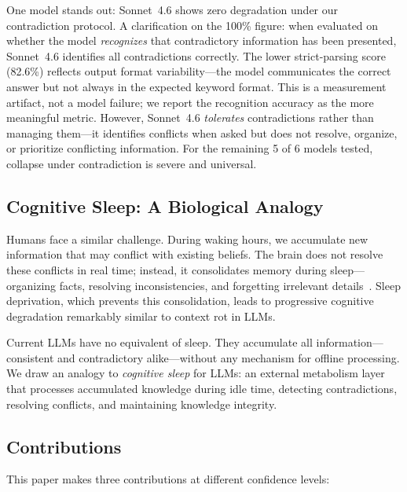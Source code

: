 \documentclass[11pt,a4paper]{article}
\begin{document}
One model stands out: Sonnet~4.6 shows zero degradation under our contradiction protocol.
A clarification on the 100\% figure: when evaluated on whether the model \emph{recognizes} that contradictory information has been presented, Sonnet~4.6 identifies all contradictions correctly.
The lower strict-parsing score (82.6\%) reflects output format variability---the model communicates the correct answer but not always in the expected keyword format.
This is a measurement artifact, not a model failure; we report the recognition accuracy as the more meaningful metric.
However, Sonnet~4.6 \emph{tolerates} contradictions rather than managing them---it identifies conflicts when asked but does not resolve, organize, or prioritize conflicting information.
For the remaining 5 of 6 models tested, collapse under contradiction is severe and universal.

\subsection{Cognitive Sleep: A Biological Analogy}

Humans face a similar challenge.
During waking hours, we accumulate new information that may conflict with existing beliefs.
The brain does not resolve these conflicts in real time; instead, it consolidates memory during sleep---organizing facts, resolving inconsistencies, and forgetting irrelevant details~\citep{walker2017sleep,stickgold2005sleep}.
Sleep deprivation, which prevents this consolidation, leads to progressive cognitive degradation remarkably similar to context rot in LLMs.

Current LLMs have no equivalent of sleep.
They accumulate all information---consistent and contradictory alike---without any mechanism for offline processing.
We draw an analogy to \emph{cognitive sleep} for LLMs: an external metabolism layer that processes accumulated knowledge during idle time, detecting contradictions, resolving conflicts, and maintaining knowledge integrity.

\subsection{Contributions}

This paper makes three contributions at different confidence levels:
\end{document}
